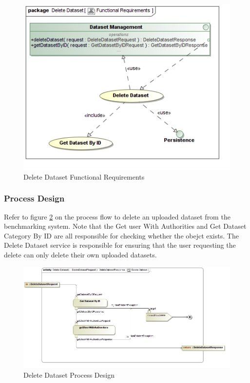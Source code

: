 \begin{figure}[H]
  \begin{center}
  \includegraphics[scale=0.38]{../Diagrams and Charts/Repository Management/Delete Dataset Functional Requirements.jpg}
  \caption{Delete Dataset Functional Requirements}
  \label{fig:deleteAlgorithmFuncReq}
  \end{center}  
\end{figure}

\subsubsection{Process Design}
Refer to figure \ref{fig:deleteDatasetProcessDesign} on the process flow to delete
an uploaded dataset from the benchmarking system. Note that the Get user
With Authorities and Get Dataset Category By ID are all responsible for checking
whether the obejct exists. The Delete Dataset service is responsible for ensuring
that the user requesting the delete can only delete their own uploaded datasets.
\begin{figure}[H]
  \begin{center}
  \includegraphics[scale=0.38]{../Diagrams and Charts/Repository Management/Delete Dataset Process Design.jpg}
  \caption{Delete Dataset Process Design}
  \label{fig:deleteDatasetProcessDesign}
  \end{center}
\end{figure}



